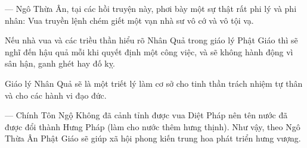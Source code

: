 --- Ngô Thừa Ân, tại các hồi truyện này, phơi bày một sự thật rất phi lý và phi nhân: Vua truyền lệnh chém giết một vạn nhà sư vô cớ và vô tội vạ.

Nếu nhà vua và các triều thần hiểu rõ Nhân Quả trong giáo lý Phật Giáo thì sẽ nghĩ đến hậu quả mỗi khi quyết định một công việc, và sẽ không hành động vì sân hận, ganh ghét hay đố kỵ.

Giáo lý Nhân Quả sẽ là một triết lý làm cơ sở cho tinh thần trách nhiệm tự thân và cho các hành vi đạo đức.

--- Chính Tôn Ngộ Không đã cảnh tỉnh được vua Diệt Pháp nên tên nước đã được đổi thành Hưng Pháp (làm cho nước thêm hưng thịnh). Như vậy, theo Ngô Thừa Ân Phật Giáo sẽ giúp xã hội phong kiến trung hoa phát triển hưng vượng.
